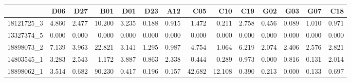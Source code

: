 \begin{tabular}{lrrrrrrrrrrrrr}
\toprule
{} &    D06 &    D27 &     B01 &    D01 &    D23 &    A12 &     C05 &     C10 &    C19 &    G02 &    G03 &    G07 &    C18 \\
\midrule
18121725\_3 &  4.860 &  2.477 &  10.200 &  3.235 &  0.188 &  0.915 &   1.472 &   0.211 &  2.758 &  0.456 &  0.089 &  1.010 &  0.971 \\
13327374\_5 &  0.000 &  0.000 &   0.000 &  0.000 &  0.000 &  0.000 &   0.000 &   0.000 &  0.000 &  0.000 &  0.000 &  0.000 &  0.000 \\
18898073\_2 &  7.139 &  3.963 &  22.821 &  3.141 &  1.295 &  0.987 &   4.754 &   1.064 &  6.219 &  2.074 &  2.406 &  2.576 &  2.821 \\
14803545\_1 &  3.283 &  2.543 &   1.172 &  3.887 &  0.863 &  2.338 &   0.444 &   0.289 &  0.973 &  0.000 &  0.816 &  0.131 &  2.014 \\
18898062\_1 &  3.514 &  0.682 &  90.230 &  0.417 &  0.196 &  0.157 &  42.682 &  12.108 &  0.390 &  0.213 &  0.000 &  0.133 &  0.697 \\
\bottomrule
\end{tabular}
